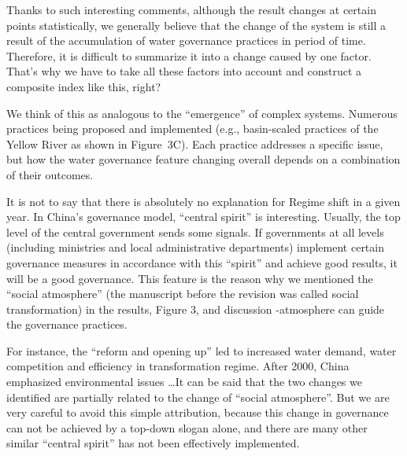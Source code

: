 \AR{} Thanks to such interesting comments, although the result changes at certain points statistically, we generally believe that the change of the system is still a result of the accumulation of water governance practices in period of time. Therefore, it is difficult to summarize it into a change caused by one factor. That's why we have to take all these factors into account and construct a composite index like this, right?

\AR*{} We think of this as analogous to the ``emergence'' of complex systems. Numerous practices being proposed and implemented (e.g., basin-scaled practices of the Yellow River as shown in Figure~3C). Each practice addresses a specific issue, but how the water governance feature changing overall depends on a combination of their outcomes.

\AR*{} It is not to say that there is absolutely no explanation for Regime shift in a given year. In China's governance model, ``central spirit'' is interesting. Usually, the top level of the central government sends some signals. If governments at all levels (including ministries and local administrative departments) implement certain governance measures in accordance with this ``spirit'' and achieve good results, it will be a good governance. This feature is the reason why we mentioned the ``social atmosphere'' (the manuscript before the revision was called social transformation) in the results, Figure 3, and discussion -atmosphere can guide the governance practices.

\AR*{} For instance, the ``reform and opening up'' led to increased water demand, water competition and efficiency in transformation regime. After 2000, China emphasized environmental issues \dots It can be said that the two changes we identified are partially related to the change of ``social atmosphere''. But we are very careful to avoid this simple attribution, because this change in governance can not be achieved by a top-down slogan alone, and there are many other similar ``central spirit'' has not been effectively implemented.

